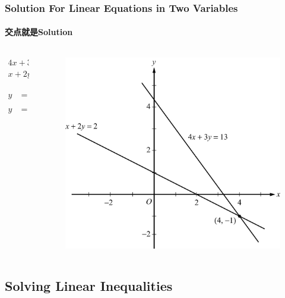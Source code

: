 \documentclass[
	11pt, %
	handout,
]{beamer}
\begin{document}
	\begin{frame}
	\frametitle{Solution For Linear Equations in Two Variables}
	\framesubtitle{交点就是Solution}
	\begin{columns}[t] 
		\begin{column}{0.3\textwidth} %
		\begin{equation*}
			\begin{aligned}
				4x + 3y &= 13 \\
				x + 2y &= 2
			\end{aligned}
		\end{equation*}

		\bigskip
		\begin{equation*}
			\begin{aligned}
				y &= -\frac{3}{4} + \frac{13}{4} \\
				y &= -\frac{1}{2}x + 1
			\end{aligned}
		\end{equation*}

		\end{column}
		\begin{column}{0.7\textwidth} %
			\begin{figure}
				\includegraphics[width=0.8\linewidth]{Graphing_Linear_Equations.jpg} 
			\end{figure}
    \end{column}
	\end{columns}	
\end{frame}

\subsection{Solving Linear Inequalities}
\end{document}
